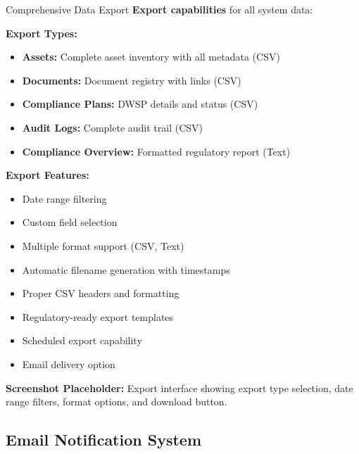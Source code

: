 \documentclass[11pt,a4paper]{article}
\begin{document}
\begin{featurebox}{Comprehensive Data Export}
    \textbf{Export capabilities} for all system data:

    \vspace{0.5cm}
    \textbf{Export Types:}
    \begin{itemize}[itemsep=0.2em]
        \item \textbf{Assets:} Complete asset inventory with all metadata (CSV)
        \item \textbf{Documents:} Document registry with links (CSV)
        \item \textbf{Compliance Plans:} DWSP details and status (CSV)
        \item \textbf{Audit Logs:} Complete audit trail (CSV)
        \item \textbf{Compliance Overview:} Formatted regulatory report (Text)
    \end{itemize}

    \vspace{0.5cm}
    \textbf{Export Features:}
    \begin{itemize}[itemsep=0.2em]
        \item Date range filtering
        \item Custom field selection
        \item Multiple format support (CSV, Text)
        \item Automatic filename generation with timestamps
        \item Proper CSV headers and formatting
        \item Regulatory-ready export templates
        \item Scheduled export capability
        \item Email delivery option
    \end{itemize}
\end{featurebox}

\vspace{0.5cm}

\textbf{Screenshot Placeholder:} Export interface showing export type selection, date range filters, format options, and download button.

\vspace{1cm}

\subsection{Email Notification System}
\end{document}
